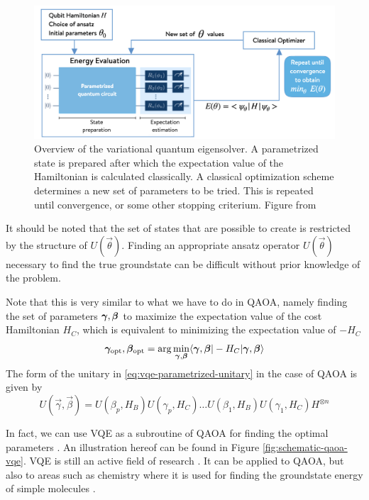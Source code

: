 \begin{figure}[H]
	\centering
	\includegraphics[scale=0.4]{figures/VQE_overview.png}
	\caption{Overview of the variational quantum eigensolver. A parametrized state is prepared after which the expectation value of the Hamiltonian is calculated classically. A classical optimization scheme determines a new set of parameters to be tried. This is repeated until convergence, or some other stopping criterium. Figure from \cite{vqe-figure}}
	\label{fig:vqe}
\end{figure}

It should be noted that the set of states that are possible to create is restricted by the structure of $U(\vec{\theta})$. Finding an appropriate ansatz operator $U(\vec{\theta})$ necessary to find the true groundstate can be difficult without prior knowledge of the problem.

Note that this is very similar to what we have to do in QAOA, namely finding the set of parameters $\bm{\gamma},\bm{\beta}$ to maximize the expectation value of the cost Hamiltonian $H_C$, which is equivalent to minimizing the expectation value of $-H_C$
\begin{equation}
\bm{\gamma}_{\text{opt}}, \bm{\beta}_{\text{opt}} = \arg \min_{\bm{\gamma}, \bm{\beta}} \langle \bm{\gamma},\bm{\beta} | -H_C | \bm{\gamma},\bm{\beta} \rangle
\end{equation}
The form of the unitary in \eqref{eq:vqe-parametrized-unitary} in the case of QAOA is given by
\begin{equation}
	U(\vec{\gamma}, \vec{\beta}) = U(\beta_p, H_B)U(\gamma_p, H_C) \dots U(\beta_1, H_B)U(\gamma_1, H_C)H^{\otimes n}
\end{equation}

In fact, we can use VQE as a subroutine of QAOA for finding the optimal parameters \cite{ZWCPL18, Yao20}. An illustration hereof can be found in Figure \ref{fig:schematic-qaoa-vqe}. VQE is still an active field of research \cite{active-1,active-2,active-3}. It can be applied to QAOA, but also to areas such as chemistry where it is used for finding the groundstate energy of simple molecules \cite{VQE}.

